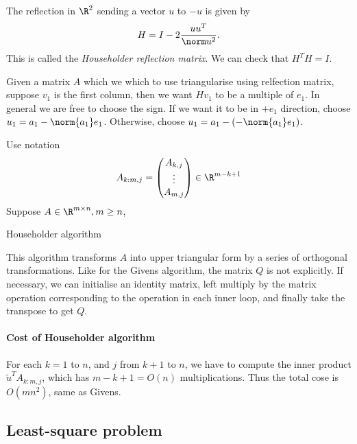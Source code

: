 \documentclass[a4paper]{article}
\begin{document}
The reflection in \(\R^2\) sending a vector \(u\) to \(-u\) is given by
\[
  H = I - 2 \frac{uu^T}{\norm u^2}.
\]
This is called the \emph{Householder reflection matrix}. We can check that \(H^TH = I\).

Given a matrix \(A\) which we which to use triangularise using relfection matrix, suppose \(v_1\) is the first column, then we want \(Hv_1\) to be a multiple of \(e_1\). In general we are free to choose the sign. If we want it to be in \(+e_1\) direction, choose \(u_1 = a_1 - \norm{a_1}e_1\). Otherwise, choose \(u_1 = a_1 - (-\norm{a_1}e_1)\).

Use notation
\[
  A_{k:m, j} =
  \begin{pmatrix}
    A_{k, j} \\
    \vdots \\
    A_{m, j}
  \end{pmatrix}
  \in \R^{m - k + 1}
\]
Suppose \(A \in \R^{m \times n}, m \geq n\),

\begin{algorithm}
  \caption{Householder algorithm}
\end{algorithm}

This algorithm transforms \(A\) into upper triangular form by a series of orthogonal transformations. Like for the Givens algorithm, the matrix \(Q\) is not explicitly. If necessary, we can initialise an identity matrix, left multiply by the matrix operation corresponding to the operation in each inner loop, and finally take the transpose to get \(Q\).

\paragraph{Cost of Householder algorithm}

For each \(k = 1\) to \(n\), and \(j\) from \(k + 1\) to \(n\), we have to compute the inner product \(\tilde u^T A_{k:m, j}\), which has \(m - k + 1 = O(n)\) multiplications. Thus the total cose is \(O(mn^2)\), same as Givens.

\subsection{Least-square problem}
\end{document}
